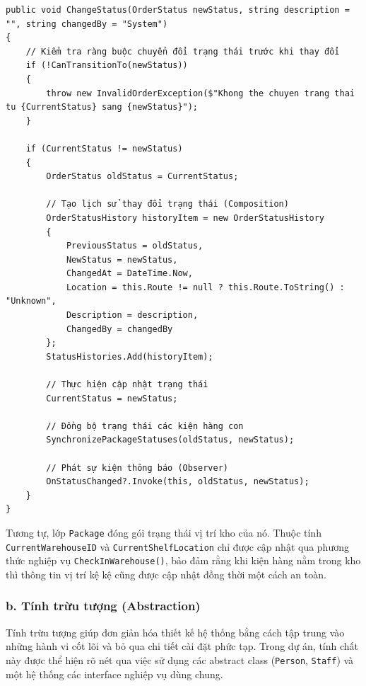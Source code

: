 \documentclass[12pt,a4paper]{article}
\begin{document}
\begin{listing}[H]
\caption{Phương thức ChangeStatus thể hiện tính đóng gói trong lớp Order}
\begin{verbatim}
public void ChangeStatus(OrderStatus newStatus, string description = "", string changedBy = "System")
{
    // Kiểm tra ràng buộc chuyển đổi trạng thái trước khi thay đổi
    if (!CanTransitionTo(newStatus))
    {
        throw new InvalidOrderException($"Khong the chuyen trang thai tu {CurrentStatus} sang {newStatus}");
    }

    if (CurrentStatus != newStatus)
    {
        OrderStatus oldStatus = CurrentStatus;
        
        // Tạo lịch sử thay đổi trạng thái (Composition)
        OrderStatusHistory historyItem = new OrderStatusHistory
        {
            PreviousStatus = oldStatus,
            NewStatus = newStatus,
            ChangedAt = DateTime.Now,
            Location = this.Route != null ? this.Route.ToString() : "Unknown",
            Description = description,
            ChangedBy = changedBy
        };
        StatusHistories.Add(historyItem);
        
        // Thực hiện cập nhật trạng thái
        CurrentStatus = newStatus;
        
        // Đồng bộ trạng thái các kiện hàng con
        SynchronizePackageStatuses(oldStatus, newStatus);
        
        // Phát sự kiện thông báo (Observer)
        OnStatusChanged?.Invoke(this, oldStatus, newStatus);
    }
}
\end{verbatim}
\end{listing}

Tương tự, lớp \texttt{Package} đóng gói trạng thái vị trí kho của nó. Thuộc tính \texttt{CurrentWarehouseID} và \texttt{CurrentShelfLocation} chỉ được cập nhật qua phương thức nghiệp vụ \texttt{CheckInWarehouse()}, bảo đảm rằng khi kiện hàng nằm trong kho thì thông tin vị trí kệ kệ cũng được cập nhật đồng thời một cách an toàn.

\subsubsection*{b. Tính trừu tượng (Abstraction)}

Tính trừu tượng giúp đơn giản hóa thiết kế hệ thống bằng cách tập trung vào những hành vi cốt lõi và bỏ qua chi tiết cài đặt phức tạp. Trong dự án, tính chất này được thể hiện rõ nét qua việc sử dụng các abstract class (\texttt{Person}, \texttt{Staff}) và một hệ thống các interface nghiệp vụ dùng chung.
\end{document}
